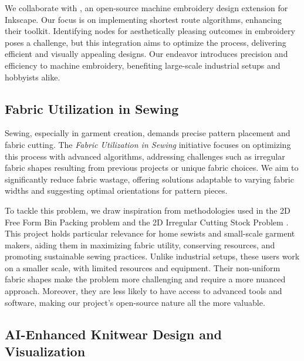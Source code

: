 \documentclass{article}
\begin{document}
    We collaborate with \citet{inkstitch}, an open-source machine embroidery design extension for Inkscape.
    Our focus is on implementing shortest route algorithms, enhancing their toolkit. Identifying nodes for
    aesthetically pleasing outcomes in embroidery poses a challenge, but this integration aims to optimize the
    process, delivering efficient and visually appealing designs. Our endeavor introduces precision and efficiency to
    machine embroidery, benefiting large-scale industrial setups and hobbyists alike.

    \subsection{Fabric Utilization in Sewing}

    Sewing, especially in garment creation, demands precise pattern placement and fabric cutting. The \emph{Fabric
    Utilization in Sewing} initiative focuses on optimizing this process with advanced algorithms, addressing
    challenges such as irregular fabric shapes resulting from previous projects or unique fabric choices. We aim to
    significantly reduce fabric wastage, offering solutions adaptable to varying fabric widths and suggesting optimal
    orientations for pattern pieces.

    To tackle this problem, we draw inspiration from methodologies used in the 2D Free Form Bin Packing problem and the
    2D Irregular Cutting Stock Problem \citep{bennell2009tutorial, xu2016efficient}.
    This project holds particular relevance for home sewists and small-scale garment makers, aiding them in
    maximizing fabric utility, conserving resources, and promoting sustainable sewing practices. Unlike industrial
    setups, these users work on a smaller scale, with limited resources and equipment. Their non-uniform fabric
    shapes make the problem more challenging and require a more nuanced approach. Moreover, they are less likely to
    have access to advanced tools and software, making our project's open-source nature all the more valuable.

    \subsection{AI-Enhanced Knitwear Design and Visualization}
\end{document}
